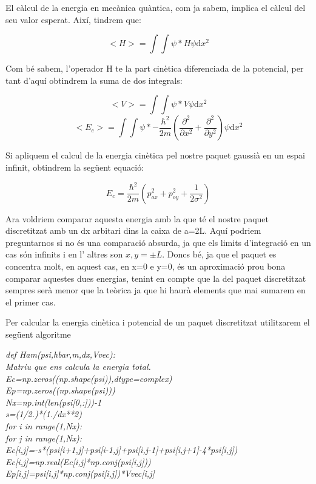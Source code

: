 \documentclass{article}
\begin{document}
El càlcul de la energia en mecànica quàntica, com ja sabem, implica el càlcul del seu valor esperat. Així, tindrem que:

\begin{equation}
<H>=\int\int\psi*H\psi \mathrm{d}x^2
\end{equation}

Com bé sabem, l'operador H te la part cinètica diferenciada de la potencial, per tant d'aquí obtindrem la suma de dos integrals:

\begin{equation}
<V>=\int\int\psi*V\psi \mathrm{d}x^2
\end{equation}
\begin{equation}
<E_c>=\int\int\psi*-\frac{\hbar^2}{2m}(\frac{\partial^2}{\partial x^2}+\frac{\partial^2}{\partial y^2})\psi \mathrm{d}x^2
\end{equation}

Si apliquem el calcul de la energia cinètica pel nostre paquet gaussià en un espai infinit, obtindrem la següent equació:

\begin{equation}
E_c=\frac{\hbar^2}{2m}(p_{ox}^2+p_{oy}^2+\frac{1}{2\sigma^2})
\end{equation}

Ara voldriem comparar aquesta energia amb la que té el nostre paquet discretitzat amb un dx arbitari dins la caixa de a=2L. Aquí podriem preguntarnos si no és una comparació absurda, ja que els limits d'integració en un cas són infinits i en l' altres son \(x,y=\pm L\). Doncs bé, ja que el paquet es concentra molt, en aquest cas, en x=0 e y=0, és un aproximació prou bona comparar aquestes dues energias, tenint en compte que la del paquet discretitzat sempres serà menor que la teòrica ja que hi haurà elements que mai sumarem en el primer cas.

Per calcular la energia cinètica i potencial de un paquet discretitzat utilitzarem el següent algoritme


\textit{def Ham(psi,hbar,m,dx,Vvec):\\Matriu que ens calcula la energia total.\\Ec=np.zeros((np.shape(psi)),dtype=complex)\\Ep=np.zeros((np.shape(psi)))\\Nx=np.int(len(psi[0,:]))-1\\s=(1/2.)*(1./dx**2)\\for i in range(1,Nx):\\for j in range(1,Nx):\\Ec[i,j]=-s*(psi[i+1,j]+psi[i-1,j]+psi[i,j-1]+psi[i,j+1]-4*psi[i,j])\\Ec[i,j]=np.real(Ec[i,j]*np.conj(psi[i,j]))\\Ep[i,j]=psi[i,j]*np.conj(psi[i,j])*Vvec[i,j] }
\end{document}
